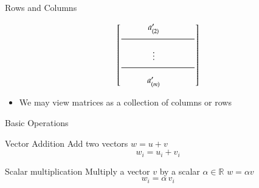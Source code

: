 \documentclass[10pt]{beamer}
\begin{document}
\begin{frame}{Rows and Columns}
\begin{minipage}[t]{0.45\textwidth}
\begin{equation*}
\begin{bmatrix}
                   \begin{matrix} & & a'_{(2)}& & & \end{matrix} \\
                   \dfrac{\makebox[1.2in]{}}{\makebox[1.2in]{}} \\
                   \begin{matrix} & & \vdots & & & \end{matrix} \\
                   \dfrac{\makebox[1.2in]{}}{\makebox[1.2in]{}} \\
                   \begin{matrix} & & a'_{(m)}& & & \end{matrix} \\
    \end{bmatrix}
\end{equation*}
\end{minipage}
\begin{itemize}
    \item We may view matrices as a collection of columns or rows
\end{itemize}
\end{frame}



\begin{frame}{Basic Operations}


\begin{block}{Vector Addition}
Add two vectors $w=u+v$
$$
    w_i = u_i+v_i
$$    
\end{block}


\begin{block}{Scalar multiplication}
Multiply a vector $v$ by a scalar $\alpha \in \mathbb{R}$  $w = \alpha v$
$$
    w_i = \alpha \,v_i
$$
\end{block}


\end{frame}


\end{document}
